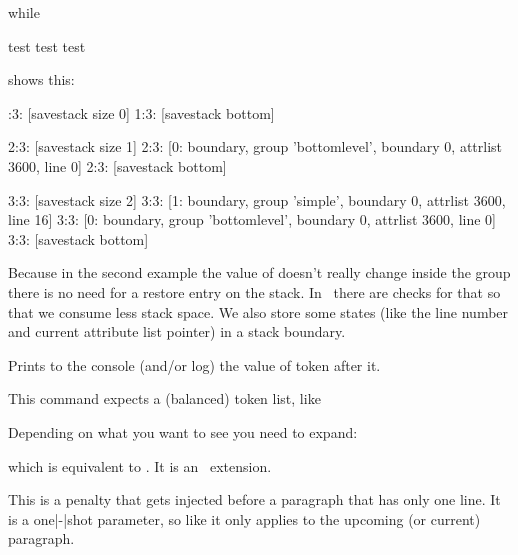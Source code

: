 while

\starttyping
  test \showstack
 {test \showstack}
{{test \showstack}}
\stoptyping

shows this:

:3: [savestack size 0]
1:3: [savestack bottom]

2:3: [savestack size 1]
2:3: [0: boundary, group 'bottomlevel', boundary 0, attrlist 3600, line 0]
2:3: [savestack bottom]

3:3: [savestack size 2]
3:3: [1: boundary, group 'simple', boundary 0, attrlist 3600, line 16]
3:3: [0: boundary, group 'bottomlevel', boundary 0, attrlist 3600, line 0]
3:3: [savestack bottom]
\stoptyping

Because in the second example the value of \type {\scratchcounter} doesn't really
change inside the group there is no need for a restore entry on the stack. In
\LUAMETATEX\ there are checks for that so that we consume less stack space. We
also store some states (like the line number and current attribute list pointer)
in a stack boundary.

\stopoldprimitive

\startoldprimitive[title={\prm {showthe}}]

Prints to the console (and/or log) the value of token after it.

\stopoldprimitive

\startoldprimitive[title={\prm {showtokens}}]

This command expects a (balanced) token list, like

\starttyping
{}
\stoptyping

Depending on what you want to see you need to expand:

\starttyping
\showtokens\expandafter{\the\everypar}
\stoptyping

which is equivalent to \typ {\showthe \everypar}. It is an \ETEX\ extension.

\stopoldprimitive

\startnewprimitive[title={\prm {singlelinepenalty}}]

This is a penalty that gets injected before a paragraph that has only one line.
It is a one|-|shot parameter, so like  it only applies to the
upcoming (or current) paragraph.

\stopnewprimitive

\startoldprimitive[title={\prm {skewchar}}][obsolete=yes]

